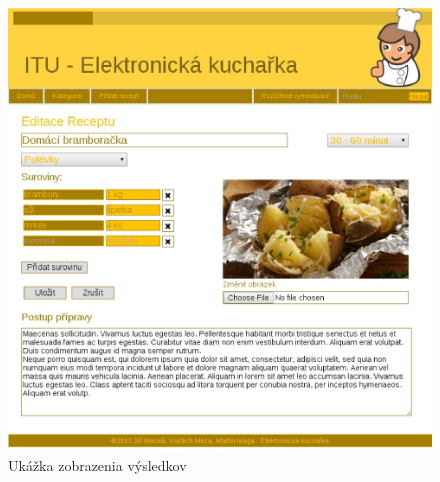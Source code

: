 \documentclass[12pt,a4paper,titlepage,final]{article}
\begin{document}
\begin{figure}

\begin{center}

\includegraphics[scale=0.7]{img/edit.eps} 
\caption{Ukážka zobrazenia výsledkov}


\end{center}

\end{figure}
\end{document}
